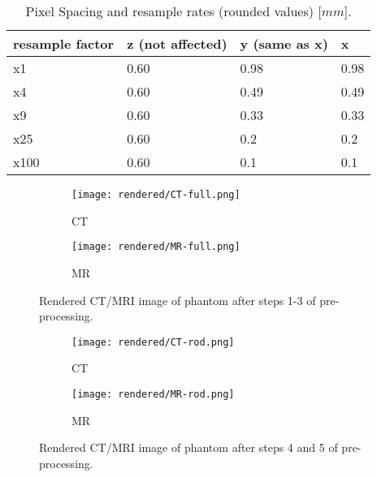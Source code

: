\begin{table}[!htb]
\centering
\caption[Pixel Spacing and resample rates.]{Pixel Spacing and resample rates (rounded values) [$mm$].}
\begin{tabular}{l|l|l|l}
resample factor  & z (not affected) &  y (same as x) & x \\
\toprule
x1     & 0.60 & 0.98	& 0.98	\\
x4     & 0.60 & 0.49	& 0.49	\\
x9     & 0.60 & 0.33	& 0.33	\\
x25    & 0.60 & 0.2 	& 0.2	\\
x100   & 0.60 & 0.1 	& 0.1
\end{tabular}
\label{tab:spacing}
\end{table}

\begin{figure}[!thb]

  \begin{subfigure}[b]{0.45\textwidth}
    \texttt{[image: rendered/CT-full.png]}
    \caption{CT}
    \label{fig:CT_full}
  \end{subfigure}
  \hfill
  \begin{subfigure}[b]{0.45\textwidth}
    \texttt{[image: rendered/MR-full.png]}
    \caption{MR}
    \label{fig:MR_full}
  \end{subfigure}
  \caption{Rendered CT/MRI image of phantom after steps 1-3 of pre-processing.}
  \label{fig:rendering1-3}
\end{figure}
  
\begin{figure}[!thb]
  \begin{subfigure}[b]{0.45\textwidth}
    \texttt{[image: rendered/CT-rod.png]}
    \caption{CT}
    \label{fig:CT_rod}
  \end{subfigure}
  \hfill
  \begin{subfigure}[b]{0.45\textwidth}
    \texttt{[image: rendered/MR-rod.png]}
    \caption{MR}
    \label{fig:MR_rod}
  \end{subfigure}
  
  \caption{Rendered CT/MRI image of phantom after steps 4 and 5 of pre-processing.}
  \label{fig:rendering4-5}
\end{figure}


